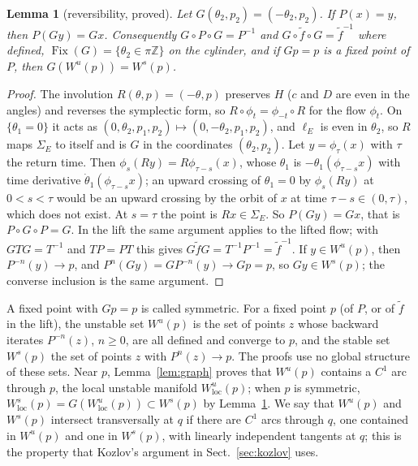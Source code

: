 \documentclass[11pt]{article}
\newtheorem{lemma}{Lemma}
\theoremstyle{definition}
\newcommand{\Z}{\mathbb{Z}}
\newcommand{\Fix}{\operatorname{Fix}}
\newcommand{\tf}{\tilde f}
\begin{document}
\begin{lemma}[reversibility, proved]\label{lem:rev}
Let $G(\theta_2, p_2) = (-\theta_2, p_2)$. If $P(x) = y$, then $P(Gy) = Gx$. Consequently $G \circ P \circ G = P^{-1}$ and $G \circ \tf \circ G = \tf^{-1}$ where defined, $\Fix(G) = \{\theta_2 \in \pi\Z\}$ on the cylinder, and if $Gp = p$ is a fixed point of $P$, then $G(W^u(p)) = W^s(p)$.
\end{lemma}

\begin{proof}
The involution $R(\theta, p) = (-\theta, p)$ preserves $H$ ($c$ and $D$ are even in the angles) and reverses the symplectic form, so $R \circ \phi_t = \phi_{-t} \circ R$ for the flow $\phi_t$. On $\{\theta_1 = 0\}$ it acts as $(0, \theta_2, p_1, p_2) \mapsto (0, -\theta_2, p_1, p_2)$, and $\ell_E$ is even in $\theta_2$, so $R$ maps $\Sigma_E$ to itself and is $G$ in the coordinates $(\theta_2, p_2)$. Let $y = \phi_\tau(x)$ with $\tau$ the return time. Then $\phi_s(Ry) = R\phi_{\tau - s}(x)$, whose $\theta_1$ is $-\theta_1(\phi_{\tau - s}x)$ with time derivative $\dot\theta_1(\phi_{\tau-s}x)$; an upward crossing of $\theta_1 = 0$ by $\phi_s(Ry)$ at $0 < s < \tau$ would be an upward crossing by the orbit of $x$ at time $\tau - s \in (0, \tau)$, which does not exist. At $s = \tau$ the point is $Rx \in \Sigma_E$. So $P(Gy) = Gx$, that is $P \circ G \circ P = G$. In the lift the same argument applies to the lifted flow; with $GTG = T^{-1}$ and $TP = PT$ this gives $G\tf G = T^{-1}P^{-1} = \tf^{-1}$. If $y \in W^u(p)$, then $P^{-n}(y) \to p$, and $P^n(Gy) = GP^{-n}(y) \to Gp = p$, so $Gy \in W^s(p)$; the converse inclusion is the same argument.
\end{proof}

A fixed point with $Gp = p$ is called symmetric. For a fixed point $p$ (of $P$, or of $\tf$ in the lift), the unstable set $W^u(p)$ is the set of points $z$ whose backward iterates $P^{-n}(z)$, $n \ge 0$, are all defined and converge to $p$, and the stable set $W^s(p)$ the set of points $z$ with $P^n(z) \to p$. The proofs use no global structure of these sets. Near $p$, Lemma~\ref{lem:graph} proves that $W^u(p)$ contains a $C^1$ arc through $p$, the local unstable manifold $W^u_{\mathrm{loc}}(p)$; when $p$ is symmetric, $W^s_{\mathrm{loc}}(p) = G(W^u_{\mathrm{loc}}(p)) \subset W^s(p)$ by Lemma~\ref{lem:rev}. We say that $W^u(p)$ and $W^s(p)$ intersect transversally at $q$ if there are $C^1$ arcs through $q$, one contained in $W^u(p)$ and one in $W^s(p)$, with linearly independent tangents at $q$; this is the property that Kozlov's argument in Sect.~\ref{sec:kozlov} uses.
\end{document}
